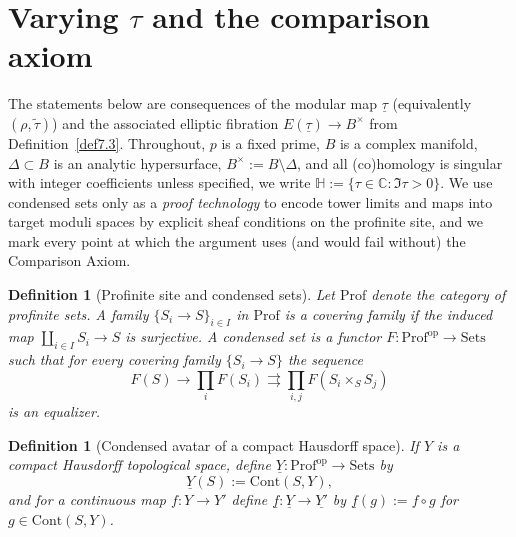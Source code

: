 \documentclass[11pt]{article}
\newtheorem{definition}[theorem]{Definition}
\theoremstyle{remark}
\begin{document}
{\section{Varying \texorpdfstring{\(\tau\)}{tau} and the comparison axiom}\label{app:varying-conditional}
The statements below are consequences of the modular map $\underline{\tau}$ (equivalently $(\rho,\tilde{\tau})$)
and the associated elliptic fibration $E(\underline{\tau})\to B^\times$ from Definition~\eqref{def7.3}.
 Throughout, $p$ is a fixed prime, $B$ is a complex manifold, $\Delta\subset B$ is an analytic hypersurface, $B^\times:=B\setminus\Delta$, and all (co)homology is singular with integer coefficients unless specified, we write $\mathbb{H}:=\{\tau\in\mathbb{C}:\Im\tau>0\}$. We use condensed sets only as a \emph{proof technology} to encode tower limits and maps into target moduli spaces by explicit sheaf conditions on the profinite site, and we mark every point at which the argument uses (and would fail without) the Comparison Axiom. 
\begin{definition}[Profinite site and condensed sets]\label{def:prof_cond}
Let $\mathrm{Prof}$ denote the category of profinite sets. A family $\{S_i\to S\}_{i\in I}$ in $\mathrm{Prof}$ is a covering family if the induced map $\coprod_{i\in I} S_i\to S$ is surjective. A condensed set is a functor $F:\mathrm{Prof}^{\mathrm{op}}\to\mathrm{Sets}$ such that for every covering family $\{S_i\to S\}$ the sequence
\begin{equation}\label{eq:sheaf_equalizer}
F(S)\longrightarrow \prod_i F(S_i)\rightrightarrows \prod_{i,j}F(S_i\times_S S_j)
\end{equation}
is an equalizer.
\end{definition}

\begin{definition}[Condensed avatar of a compact Hausdorff space]\label{def:condensed_yoneda}
If $Y$ is a compact Hausdorff topological space, define $\underline{Y}:\mathrm{Prof}^{\mathrm{op}}\to\mathrm{Sets}$ by
\begin{equation}\label{eq:underlineY_def}
\underline{Y}(S):=\mathrm{Cont}(S,Y),
\end{equation}
and for a continuous map $f:Y\to Y'$ define $\underline{f}:\underline{Y}\to\underline{Y'}$ by $\underline{f}(g):=f\circ g$ for $g\in\mathrm{Cont}(S,Y)$.
\end{definition}

}
\end{document}
